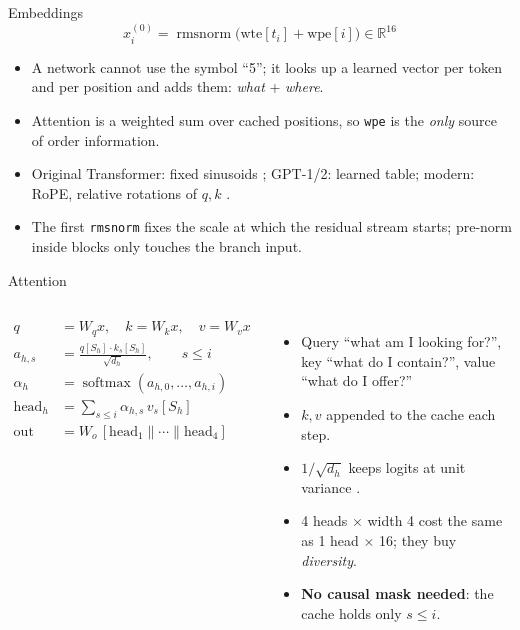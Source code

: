 \documentclass[aspectratio=169,11pt]{beamer}
\newcommand{\R}{\mathbb{R}}
\newcommand{\softmax}{\operatorname{softmax}}
\newcommand{\rmsnorm}{\operatorname{rmsnorm}}
\begin{document}
\begin{frame}{Embeddings}
\[
x^{(0)}_i = \rmsnorm\big(\mathrm{wte}[t_i] + \mathrm{wpe}[i]\big)\in\R^{16}
\]
\begin{itemize}
  \item A network cannot use the symbol ``5''; it looks up a learned vector per token and per position and adds them: \emph{what} + \emph{where}.
  \item Attention is a weighted sum over cached positions, so \texttt{wpe} is the \emph{only} source of order information.
  \item Original Transformer: fixed sinusoids \parencite{vaswani2017attention}; GPT-1/2: learned table; modern: RoPE, relative rotations of $q,k$ \parencite{su2021rope}.
  \item The first \texttt{rmsnorm} fixes the scale at which the residual stream starts; pre-norm inside blocks only touches the branch input.
\end{itemize}
\end{frame}

\begin{frame}{Attention}
\small\vspace{-4pt}
\begin{columns}
\begin{align*}
q &= W_q x,\quad k = W_k x,\quad v = W_v x \\
a_{h,s} &= \frac{q[S_h]\cdot k_s[S_h]}{\sqrt{d_h}},\qquad s\le i\\
\alpha_h &= \softmax(a_{h,0},\dots,a_{h,i})\\
\mathrm{head}_h &= \textstyle\sum_{s\le i}\alpha_{h,s}\,v_s[S_h]\\
\text{out} &= W_o\,[\mathrm{head}_1\|\cdots\|\mathrm{head}_4]
\end{align*}
\begin{itemize}
  \item Query ``what am I looking for?'', key ``what do I contain?'', value ``what do I offer?''
  \item $k, v$ appended to the cache each step.
  \item $1/\sqrt{d_h}$ keeps logits at unit variance \parencite{vaswani2017attention}.
  \item 4 heads $\times$ width 4 cost the same as 1 head $\times$ 16; they buy \emph{diversity}.
  \item \textbf{No causal mask needed}: the cache holds only $s\le i$.
\end{itemize}
\end{columns}
\end{frame}
\end{document}
